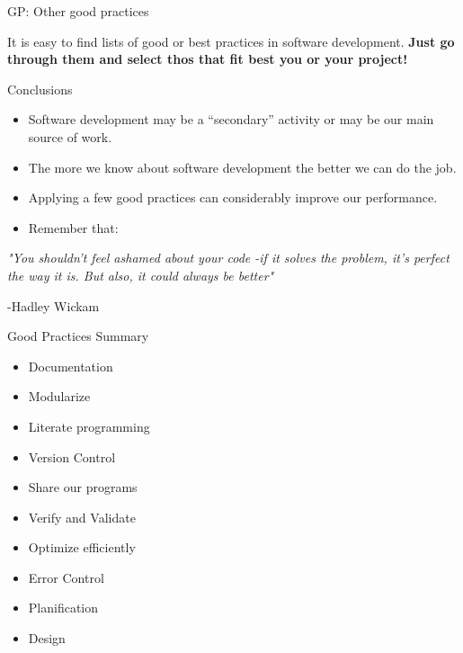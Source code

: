 \documentclass[ignorenonframetext,]{beamer}
\begin{document}
\begin{frame}{%
\protect\hypertarget{gp-other-good-practices}{%
GP: Other good practices}}

  It is easy to find lists of good or best practices in software development. \textbf{Just go through them and select thos that fit best you or your project!}

\end{frame}

\begin{frame}{%
\protect\hypertarget{in-summary}{%
Conclusions}}

\begin{itemize}
\item
  Software development may be a “secondary” activity or may be our main
  source of work.
\item
  The more we know about software development the better we can do the
  job.
\item
  Applying a few good practices can considerably improve our
  performance.
\item
  Remember that:
\end{itemize}

\emph{"You shouldn’t feel ashamed about your code -if it solves the
problem, it’s perfect the way it is. But also, it could always be
better"}

-Hadley Wickam

\end{frame}

\begin{frame}{%
		\protect\hypertarget{summary}{%
			Good Practices Summary}}
	
	\begin{itemize}
		\item Documentation
		
		\item Modularize
		
		\item Literate programming
		
		\item Version Control
		
		\item Share our programs
		
		\item Verify and Validate
		
		\item Optimize efficiently
		
		\item Error Control
		
		\item Planification
		
		\item Design
		
	\end{itemize}
	
\end{frame}
	
\end{document}
